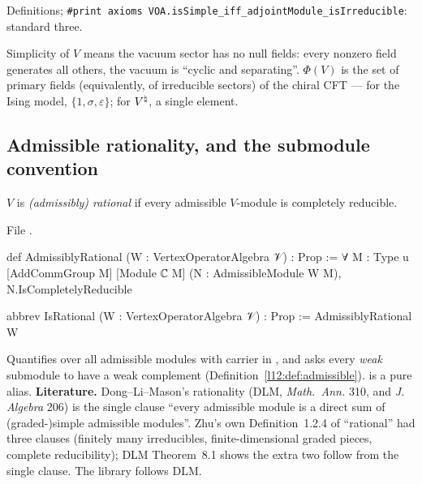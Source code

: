 \begin{status}
Definitions; \texttt{\#print axioms VOA.isSimple\_iff\_adjointModule\_isIrreducible}: standard three.
\end{status}

\begin{physics}
Simplicity of $V$ means the vacuum sector has no null fields: every nonzero field generates all others, the
vacuum is ``cyclic and separating''. $\Phi(V)$ is the set of primary fields (equivalently, of irreducible sectors) of
the chiral CFT --- for the Ising model, $\{1,\sigma,\varepsilon\}$; for ${V^{\natural}}$, a single element.
\end{physics}

\subsection{Admissible rationality, and the submodule convention}\label{l12:warn:admcr}

\begin{definition}\label{l12:def:admrat}
$V$ is \emph{(admissibly) rational} if every admissible $V$-module is completely reducible.
\end{definition}
\noindent File .
\begin{leancode}
def AdmissiblyRational (W : VertexOperatorAlgebra 𝒱) : Prop :=
  ∀ {M : Type u} [AddCommGroup M] [Module ℂ M] (N : AdmissibleModule W M),
    N.IsCompletelyReducible

abbrev IsRational (W : VertexOperatorAlgebra 𝒱) : Prop := AdmissiblyRational W
\end{leancode}

\begin{dictionary}
Quantifies over all admissible modules with carrier in , and asks every \emph{weak} submodule to have a weak
complement (Definition~\ref{l12:def:admissible}).  is a pure alias. \textbf{Literature.} Dong--Li--Mason's
rationality (DLM, \emph{Math.\ Ann.} 310, and \emph{J. Algebra} 206) is the single clause ``every admissible module is a direct
sum of (graded-)simple admissible modules''. Zhu's own Definition~1.2.4 of ``rational'' had three clauses (finitely many
irreducibles, finite-dimensional graded pieces, complete reducibility); DLM Theorem~8.1 shows the extra two follow from
the single clause. The library follows DLM.
\end{dictionary}


